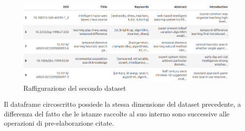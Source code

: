 \begin{figure}[H]
    \centering
    \includegraphics[width=1.0\textwidth]{img/img6.png}
    \caption{Raffigurazione del secondo dataset}
    \label{fig:3.3-3.3}
\end{figure}
Il dataframe circoscritto possiede la stessa dimensione del dataset precedente, a differenza del fatto che le istanze raccolte al suo interno sono successive alle operazioni di pre-elaborazione citate.